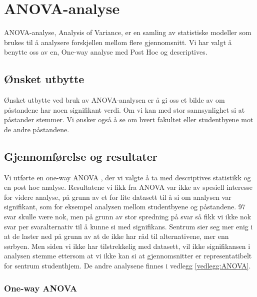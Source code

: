 \section{ANOVA-analyse}
ANOVA-analyse, Analysis of Variance, er en samling av statistiske modeller som brukes til å analysere forskjellen mellom flere gjennomsnitt. Vi har valgt å benytte oss av en, One-way analyse med Post Hoc og descriptives. 



\subsection{Ønsket utbytte}
Ønsket utbytte ved bruk av ANOVA-analysen er å gi oss et bilde av om påstandene har noen signifikant verdi. Om vi kan med stor sannsynlighet si at påstander stemmer. Vi ønsker også å se om hvert fakultet eller studentbyene mot de andre påstandene.


\subsection{Gjennomførelse og resultater}
Vi utførte en one-way ANOVA \cite{SPSSbok}, der vi valgte å ta med descriptives statistikk og en post hoc analyse. Resultatene vi fikk fra ANOVA var ikke av spesiell interesse for videre analyse, på grunn av et for lite datasett til å si om analysen var signifikant, som for eksempel analysen mellom studentbyene og påstandene. 97 svar skulle være nok, men på grunn av stor spredning på svar så fikk vi ikke nok svar per svaralternativ til å kunne si med signifikans. Sentrum sier seg mer enig i at de laster ned på grunn av at de ikke har råd til alternativene, mer enn sørbyen. Men siden vi ikke har tilstrekkelig med datasett, vil ikke signifikansen i analysen stemme ettersom at vi ikke kan si at gjennomsnitter er representatibelt for sentrum studenthjem. De andre analysene finnes i vedlegg \ref{vedlegg:ANOVA}.


\subsubsection{One-way ANOVA}

